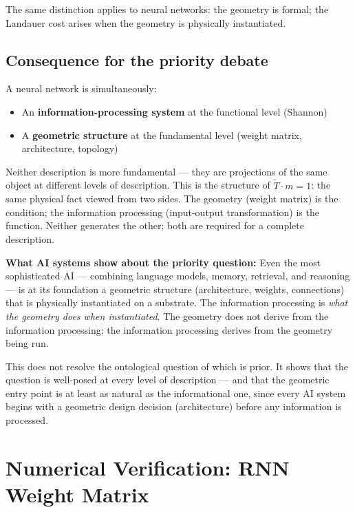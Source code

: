 The same distinction applies to neural networks: the geometry is
formal; the Landauer cost arises when the geometry is physically
instantiated.

\subsection{Consequence for the priority debate}

A neural network is simultaneously:
\begin{itemize}
  \item An \textbf{information-processing system} at the functional
        level (Shannon)
  \item A \textbf{geometric structure} at the fundamental level
        (weight matrix, architecture, topology)
\end{itemize}

Neither description is more fundamental --- they are projections of
the same object at different levels of description. This is the
structure of $\tilde{T} \cdot m = 1$: the same physical fact viewed
from two sides. The geometry (weight matrix) is the condition; the
information processing (input-output transformation) is the function.
Neither generates the other; both are required for a complete
description.

\textbf{What AI systems show about the priority question:} Even the
most sophisticated AI --- combining language models, memory, retrieval,
and reasoning --- is at its foundation a geometric structure
(architecture, weights, connections) that is physically instantiated
on a substrate. The information processing is \emph{what the geometry
does when instantiated}. The geometry does not derive from the
information processing; the information processing derives from the
geometry being run.

This does not resolve the ontological question of which is prior. It
shows that the question is well-posed at every level of description ---
and that the geometric entry point is at least as natural as the
informational one, since every AI system begins with a geometric
design decision (architecture) before any information is processed.


\section{Numerical Verification: RNN Weight Matrix}

